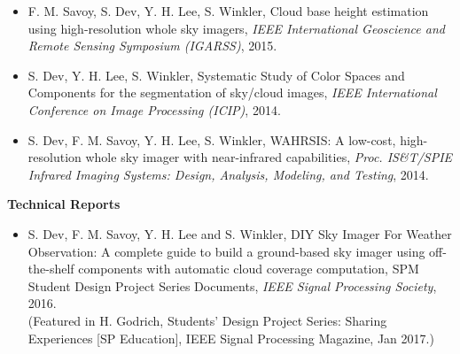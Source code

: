 \begin{itemize}[leftmargin=*]
\item F. M. Savoy, S. Dev, Y. H. Lee, S. Winkler, Cloud base height estimation using high-resolution whole sky imagers, \emph{IEEE International Geoscience and Remote Sensing Symposium (IGARSS)}, 2015.
\item S. Dev, Y. H. Lee, S. Winkler, Systematic Study of Color Spaces and Components for the segmentation of sky/cloud images, \emph{IEEE International Conference on Image Processing (ICIP)}, 2014. 
\item S. Dev, F. M. Savoy, Y. H. Lee, S. Winkler, WAHRSIS: A low-cost, high-resolution whole sky imager with near-infrared capabilities, \emph{Proc. IS\&T/SPIE Infrared Imaging Systems: Design, Analysis, Modeling, and Testing}, 2014.
\end{itemize}



\noindent
\textbf{Technical Reports}
\begin{itemize}[leftmargin=*]
\item S. Dev, F. M. Savoy, Y. H. Lee and S. Winkler, DIY Sky Imager For Weather Observation: A complete guide to build a ground-based sky imager using off-the-shelf components with automatic cloud coverage computation, SPM Student Design Project Series Documents, \emph{IEEE Signal Processing Society}, 2016.\\
(Featured in H. Godrich, Students' Design Project Series: Sharing Experiences [SP Education], IEEE Signal Processing Magazine, Jan 2017.)
\end{itemize}






